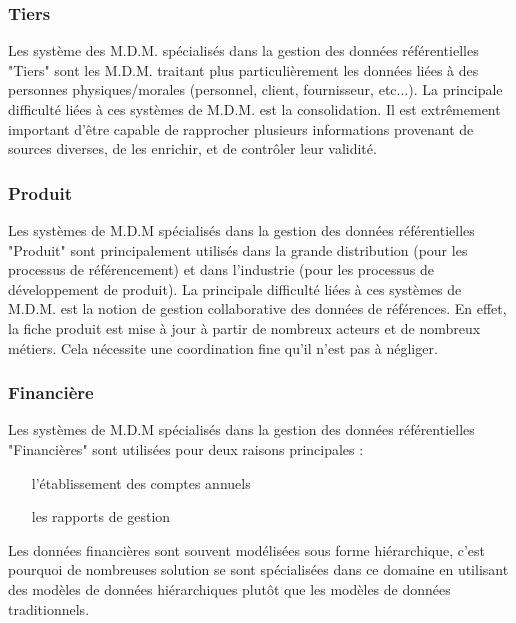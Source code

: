 \subsubsection{Tiers}

Les système des M.D.M. spécialisés dans la gestion des données référentielles "Tiers" sont les M.D.M. traitant plus particulièrement les données liées à des personnes physiques/morales (personnel, client, fournisseur, etc...).
La principale difficulté liées à ces systèmes de M.D.M. est la consolidation. Il est extrêmement important d'être capable de rapprocher plusieurs informations provenant de sources diverses, de les enrichir, et de contrôler leur validité.

\subsubsection{Produit}

Les systèmes de M.D.M spécialisés dans la gestion des données référentielles "Produit" sont principalement utilisés dans la grande distribution (pour les processus de référencement) et dans l'industrie (pour les processus de développement de produit).
La principale difficulté liées à ces systèmes de M.D.M. est la notion de gestion collaborative des données de références. En effet, la fiche produit est mise à jour à partir de nombreux acteurs et de nombreux métiers. Cela nécessite une coordination fine qu'il n'est pas à négliger.

\subsubsection{Financière}

Les systèmes de M.D.M spécialisés dans la gestion des données référentielles "Financières" sont utilisées pour deux raisons principales :

\begin{itemize}

\item[l'établissement des comptes annuels]
\item[les rapports de gestion]

\end{itemize}

Les données financières sont souvent modélisées sous forme hiérarchique, c'est pourquoi de nombreuses solution se sont spécialisées dans ce domaine en utilisant des modèles de données hiérarchiques plutôt que les modèles de données traditionnels.